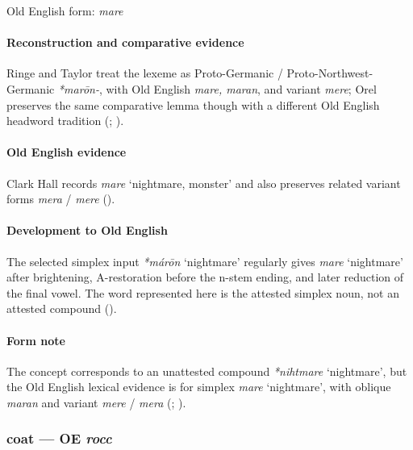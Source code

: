 \documentclass[
  british,
  a4paper,
]{article}
\providecommand{\Recon}[1]{\emph{*#1}}
\begin{document}
Old English form: \emph{mare}

\paragraph{Reconstruction and comparative
evidence}\label{reconstruction-and-comparative-evidence-45}

Ringe and Taylor treat the lexeme as Proto-Germanic /
Proto-Northwest-Germanic \emph{*marōn-}, with Old English \emph{mare,
maran}, and variant \emph{mere}; Orel preserves the same comparative
lemma though with a different Old English headword tradition
(;
).

\paragraph{Old English evidence}\label{old-english-evidence-45}

Clark Hall records \emph{mare} `nightmare, monster' and also preserves
related variant forms \emph{mera} / \emph{mere}
().

\paragraph{Development to Old
English}\label{development-to-old-english-45}

The selected simplex input \Recon{márōn} `nightmare' regularly gives
\emph{mare} `nightmare' after brightening, A-restoration before the
n-stem ending, and later reduction of the final vowel. The word
represented here is the attested simplex noun, not an attested compound
().

\paragraph{Form note}\label{form-note-14}

The concept corresponds to an unattested compound \Recon{nihtmare}
`nightmare', but the Old English lexical evidence is for simplex
\emph{mare} `nightmare', with oblique \emph{maran} and variant
\emph{mere} / \emph{mera} (; ).

\subsubsection{\texorpdfstring{coat --- OE
\emph{rocc}}{coat --- OE rocc}}\label{coat-oe-rocc}
\end{document}
